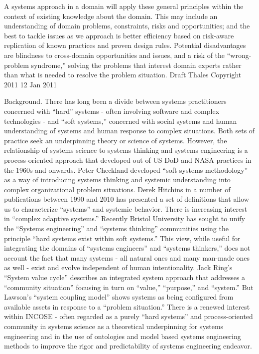 A systems approach in a domain will apply these general principles within the context of existing knowledge about the domain. This may include an understanding of domain problems, constraints, risks and opportunities; and the best to tackle issues as we approach is better efficiency based on risk-aware replication of known practices and proven design rules. Potential disadvantages are blindness to cross-domain opportunities and issues, and a risk of the ``wrong-problem syndrome,'' solving the problems that interest domain experts rather than what is needed to resolve the problem situation. Draft Thales Copyright 2011 12 Jan 2011

Background. There has long been a divide between systems practitioners concerned with ``hard'' systems - often involving software and complex technologies - and ``soft systems,'' concerned with social systems and human understanding of systems and human response to complex situations. Both sets of practice seek an underpinning theory or science of systems. However, the relationship of systems science to systems thinking and systems engineering is a process-oriented approach that developed out of US DoD and NASA practices in the 1960s and onwards. Peter Checkland developed ``soft systems methodology'' as a way of introducing systems thinking and systemic understanding into complex organizational problem situations. Derek Hitchins in a number of publications between 1990 and 2010 has presented a set of definitions that allow us to characterize ``systems'' and systemic behavior. There is increasing interest in ``complex adaptive systems.'' Recently Bristol University has sought to unify the ``Systems engineering'' and ``systems thinking'' communities using the principle ``hard systems exist within soft systems.'' This view, while useful for integrating the domains of ``systems engineers'' and ``systems thinkers,'' does not account the fact that many systems - all natural ones and many man-made ones as well - exist and evolve independent of human intentionality. Jack Ring’s ``System value cycle'' describes an integrated system approach that addresses a “community situation” focusing in turn on ``value,'' ``purpose,'' and ``system.'' But Lawson’s ``system coupling model'' shows systems as being configured from available assets in response to a ``problem situation.'' There is a renewed interest within INCOSE - often regarded as a purely ``hard systems'' and process-oriented community in systems science as a theoretical underpinning for systems engineering and in the use of ontologies and model based systems engineering methods to improve the rigor and predictability of systems engineering endeavor.

